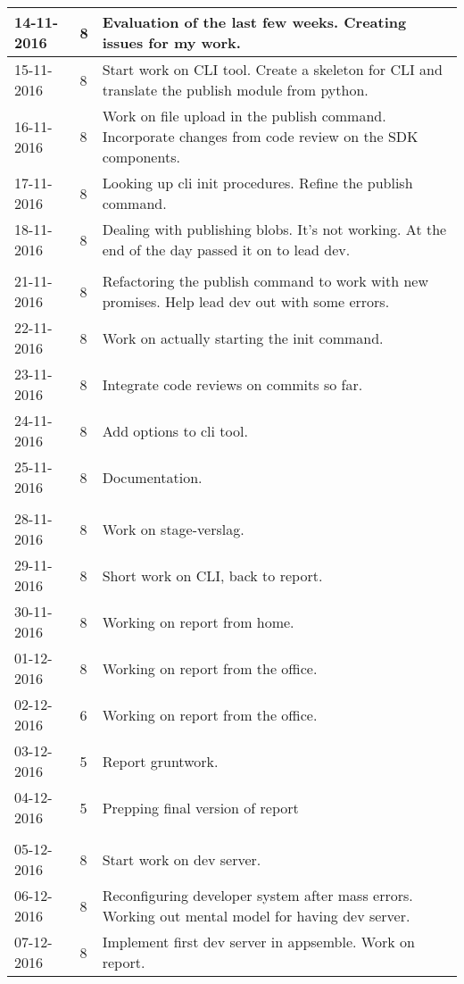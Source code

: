 \begin{tabular}{|p{2cm}|p{1cm}|p{10cm}|}
	\hline
	14-11-2016 & 8 & Evaluation of the last few weeks. Creating issues for my work. \\ \hline
	15-11-2016 & 8 & Start work on CLI tool. Create a skeleton for CLI and translate the publish module from python. \\ \hline
	16-11-2016 & 8 & Work on file upload in the publish command. Incorporate changes from code review on the SDK components. \\ \hline
	17-11-2016 & 8 & Looking up cli init procedures. Refine the publish command. \\ \hline
	18-11-2016 & 8 & Dealing with publishing blobs. It's not working. At the end of the day passed it on to lead dev. \\ \hline
	
	\\ \hline
	
	21-11-2016 & 8 & Refactoring the publish command to work with new promises. Help lead dev out with some errors. \\ \hline
	22-11-2016 & 8 & Work on actually starting the init command. \\ \hline
	23-11-2016 & 8 & Integrate code reviews on commits so far. \\ \hline
	24-11-2016 & 8 & Add options to cli tool. \\ \hline
	25-11-2016 & 8 & Documentation. \\ \hline
	
	\\ \hline
	
	28-11-2016 & 8 & Work on stage-verslag. \\ \hline
	29-11-2016 & 8 & Short work on CLI, back to report. \\ \hline
	30-11-2016 & 8 & Working on report from home. \\ \hline
	01-12-2016 & 8 & Working on report from the office. \\ \hline
	02-12-2016 & 6 & Working on report from the office. \\ \hline
	03-12-2016 & 5 & Report gruntwork. \\ \hline
	04-12-2016 & 5 & Prepping final version of report \\ \hline
	
	\\ \hline
	
	05-12-2016 & 8 & Start work on dev server. \\ \hline
	06-12-2016 & 8 & Reconfiguring developer system after mass errors. Working out mental model for having dev server. \\ \hline
	07-12-2016 & 8 & Implement first dev server in appsemble. Work on report. \\ \hline
\end{tabular}